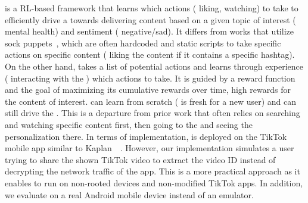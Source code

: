 \autolike{} is a RL-based framework that learns which actions (\eg{} liking, watching) to take to efficiently drive a \rs{} towards delivering content based on a given topic of interest (\eg{} mental health) and sentiment (\eg{} negative/sad). It differs from works that utilize sock puppets~\cite{HaroonYoutubePNA,RibeiroYoutubePathways,BoekerTikTokPersonalization,KaplanTikTok,iqbal-imc-alexa}, which are often hardcoded and static scripts to take specific actions on specific content (\eg{} liking the content if it contains a specific hashtag). On the other hand, \autolike{} takes a list of potential actions and learns through experience (\ie{} interacting with the \fyp{}) which actions to take. It is guided by a reward function and the goal of maximizing its cumulative rewards over time, \eg{} high rewards for the content of interest. 
\autolike{} can learn from scratch (\fyp{} is fresh for a new user) and can still drive the \rs{}. This is a departure from prior work that often relies on searching and watching specific content first, then going to the \fyp{} and seeing the personalization there.
In terms of implementation, \autolike{} is deployed on the TikTok mobile app similar to Kaplan~\etal{}~\cite{KaplanTikTok}. However, our implementation simulates a user trying to share the shown TikTok video to extract the video ID instead of decrypting the network traffic of the app. This is a more practical approach as it enables \autolike{} to run on non-rooted devices and non-modified TikTok apps. In addition, we evaluate \autolike{} on a real Android mobile device instead of an emulator.

 






